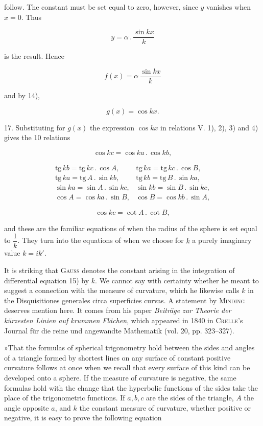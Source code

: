 %
\noindent follow. The constant must be set equal to zero, however, since $y$ vanishes when $x = 0$. Thus

\[
y = \alpha \,.\, \frac{\sin kx}{k}
\]

is the result. Hence

\[
f(x) = \alpha\, \frac{\sin kx}{k}
\]

and by 14),

\[
\tag*{(G)} g(x) = \cos kx.
\]

17. Substituting for $g(x)$ the expression $\cos kx$ in relations V. 1), 2), 3) and 4) gives the 10 relations

\[
\cos kc = \cos ka \,.\, \cos kb,
\]

\[
\begin{array}{cc}
\mathrm{tg}\, kb = \mathrm{tg}\, kc \,.\, \cos A, & \mathrm{tg}\, ka = \mathrm{tg}\, kc \,.\, \cos B, \\[4pt]
\mathrm{tg}\, ka = \mathrm{tg}\, A \,.\, \sin kb, & \mathrm{tg}\, kb = \mathrm{tg}\, B \,.\, \sin ka, \\[4pt]
\sin ka = \sin A \,.\, \sin kc, & \sin kb = \sin B \,.\, \sin kc, \\[4pt]
\cos A = \cos ka \,.\, \sin B, & \cos B = \cos kb \,.\, \sin A,
\end{array}
\]

\[
\cos kc = \cot A \,.\, \cot B,
\]

and these are the familiar equations of  when the radius of the sphere is set equal to $\dfrac{1}{k}$. They turn into the equations of  when we choose for $k$ a purely imaginary value $k = ik'$.

It is striking that \textsc{Gauss} denotes the constant arising in the integration of differential equation 15) by $k$. We cannot say with certainty whether he meant to suggest a connection with the measure of curvature, which he likewise calls $k$ in the Disquisitiones generales circa superficies curvas. A statement by \textsc{Minding} deserves mention here. It comes from his paper \emph{Beiträge zur Theorie der kürzesten Linien auf krummen Flächen}, which appeared in 1840 in \textsc{Crelle}'s Journal für die reine und angewandte Mathematik (vol. 20, pp. 323--327).

»That the formulas of spherical trigonometry hold between the sides and angles of a triangle formed by shortest lines on any surface of constant positive curvature follows at once when we recall that every surface of this kind can be developed onto a sphere. If the measure of curvature is negative, the same formulas hold with the change that the hyperbolic functions of the sides take the place of the trigonometric functions. If $a, b, c$ are the sides of the triangle, $A$ the angle opposite $a$, and $k$ the constant measure of curvature, whether positive or negative, it is easy to prove the following equation

